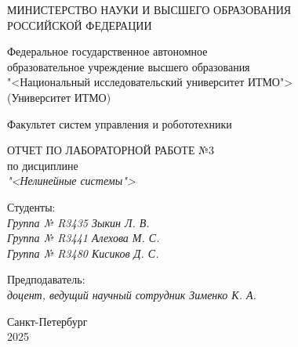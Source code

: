 \thispagestyle{empty}

\begin{center}
    МИНИСТЕРСТВО НАУКИ И ВЫСШЕГО ОБРАЗОВАНИЯ \\ РОССИЙСКОЙ ФЕДЕРАЦИИ

    \vspace{20pt}

    Федеральное государственное автономное \\ образовательное учреждение высшего образования \\
    "<Национальный исследовательский университет ИТМО"> \\
    (Университет ИТМО)

    \vspace{20pt}

    Факультет систем управления и робототехники
\end{center}

\vfill

\begin{center}
    ОТЧЕТ ПО ЛАБОРАТОРНОЙ РАБОТЕ №3\\  
    по дисциплине \\
    \textit{"<Нелинейные системы">}

    \vspace{20pt}

\end{center}

\vfill

    \noindent Студенты: \\
    \textit{Группа № R3435 \hfill Зыкин Л. В.} \\
    \textit{Группа № R3441 \hfill Алехова М. С.} \\
    \textit{Группа № R3480 \hfill Кисиков Д. С.} \\

    \vspace{20pt}

    \noindent Предподаватель: \\
    \textit{доцент, ведущий научный сотрудник \hfill Зименко К. А.}

\vfill

\begin{center}
    Санкт-Петербург \\ 2025
\end{center}